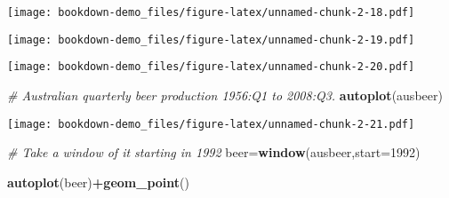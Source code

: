 \documentclass[]{book}
\newenvironment{Shaded}{\begin{snugshade}}{\end{snugshade}}
\newcommand{\CommentTok}[1]{\textcolor[rgb]{0.56,0.35,0.01}{\textit{#1}}}
\newcommand{\DataTypeTok}[1]{\textcolor[rgb]{0.13,0.29,0.53}{#1}}
\newcommand{\DecValTok}[1]{\textcolor[rgb]{0.00,0.00,0.81}{#1}}
\newcommand{\KeywordTok}[1]{\textcolor[rgb]{0.13,0.29,0.53}{\textbf{#1}}}
\newcommand{\NormalTok}[1]{#1}
\newcommand{\OperatorTok}[1]{\textcolor[rgb]{0.81,0.36,0.00}{\textbf{#1}}}
\newcommand{\OtherTok}[1]{\textcolor[rgb]{0.56,0.35,0.01}{#1}}
\newcommand{\StringTok}[1]{\textcolor[rgb]{0.31,0.60,0.02}{#1}}
\begin{document}
\begin{Shaded}
\end{Shaded}

\texttt{[image: bookdown-demo\_files/figure-latex/unnamed-chunk-2-18.pdf]}

\begin{Shaded}
\end{Shaded}

\texttt{[image: bookdown-demo\_files/figure-latex/unnamed-chunk-2-19.pdf]}

\begin{Shaded}
\end{Shaded}

\texttt{[image: bookdown-demo\_files/figure-latex/unnamed-chunk-2-20.pdf]}

\begin{Shaded}
\begin{Highlighting}[]
\CommentTok{# Australian quarterly beer production 1956:Q1 to 2008:Q3.}
  \KeywordTok{autoplot}\NormalTok{(ausbeer)}
\end{Highlighting}
\end{Shaded}

\texttt{[image: bookdown-demo\_files/figure-latex/unnamed-chunk-2-21.pdf]}

\begin{Shaded}
\begin{Highlighting}[]
  \CommentTok{# Take a window of it starting in 1992}
\NormalTok{  beer=}\KeywordTok{window}\NormalTok{(ausbeer,}\DataTypeTok{start=}\DecValTok{1992}\NormalTok{)}
  
  \KeywordTok{autoplot}\NormalTok{(beer)}\OperatorTok{+}\KeywordTok{geom_point}\NormalTok{()}
\end{Highlighting}
\end{Shaded}
\end{document}
